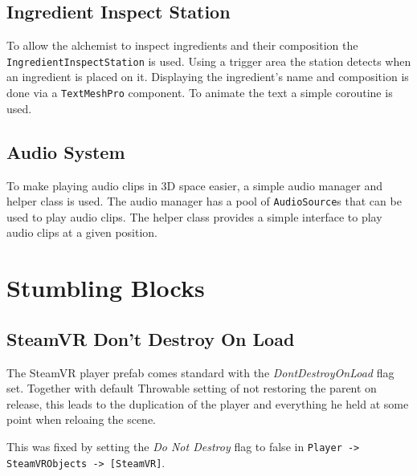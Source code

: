 \documentclass{vgtc}
\begin{document}
\subsection{Ingredient Inspect Station}

To allow the alchemist to inspect ingredients and their composition the \texttt{IngredientInspectStation} is used.
Using a trigger area the station detects when an ingredient is placed on it. Displaying the ingredient's name and
composition is done via a \texttt{TextMeshPro} component. To animate the text a simple coroutine is used.

\subsection{Audio System}

To make playing audio clips in 3D space easier, a simple audio manager and helper class is used. The audio manager
has a pool of \texttt{AudioSource}s that can be used to play audio clips. The helper class provides a simple interface
to play audio clips at a given position.

\section{Stumbling Blocks}

\subsection{SteamVR Don't Destroy On Load}

The SteamVR player prefab comes standard with the \emph{DontDestroyOnLoad} flag set. Together with default Throwable setting
of not restoring the parent on release, this leads to the duplication of the player and everything he held at some point when
reloaing the scene.

This was fixed by setting the \emph{Do Not Destroy} flag to false in \texttt{Player -> SteamVRObjects -> [SteamVR]}.

\end{document}
